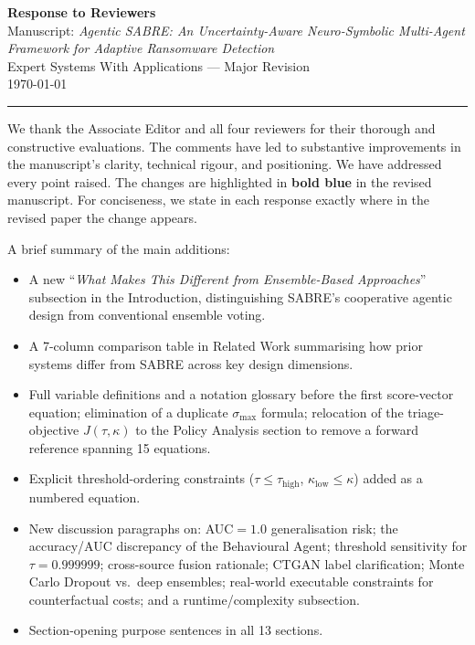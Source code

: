 \documentclass[11pt,a4paper]{article}
\begin{document}
\begin{center}
  {\LARGE\bfseries Response to Reviewers}\\[1em]
  {\large Manuscript: \textit{Agentic SABRE: An Uncertainty-Aware Neuro-Symbolic
  Multi-Agent Framework for Adaptive Ransomware Detection}}\\[0.5em]
  {\normalsize Expert Systems With Applications --- Major Revision}\\[0.5em]
  {\normalsize \today}
\end{center}

\hrule
\bigskip

We thank the Associate Editor and all four reviewers for their thorough and
constructive evaluations. The comments have led to substantive improvements in
the manuscript's clarity, technical rigour, and positioning. We have addressed
every point raised. The changes are highlighted in \textbf{bold blue} in the
revised manuscript. For conciseness, we state in each response exactly where in
the revised paper the change appears.

A brief summary of the main additions:
\begin{itemize}[leftmargin=1.5em,itemsep=2pt]
  \item A new ``\textit{What Makes This Different from Ensemble-Based Approaches}''
        subsection in the Introduction, distinguishing SABRE's cooperative agentic
        design from conventional ensemble voting.
  \item A 7-column comparison table in Related Work summarising how prior
        systems differ from SABRE across key design dimensions.
  \item Full variable definitions and a notation glossary before the first score-vector
        equation; elimination of a duplicate $\sigma_{\max}$ formula; relocation of the
        triage-objective $J(\tau,\kappa)$ to the Policy Analysis section to remove a
        forward reference spanning 15 equations.
  \item Explicit threshold-ordering constraints ($\tau \le \tau_{\text{high}}$,
        $\kappa_{\text{low}} \le \kappa$) added as a numbered equation.
  \item New discussion paragraphs on: AUC$=1.0$ generalisation risk; the
        accuracy/AUC discrepancy of the Behavioural Agent; threshold sensitivity
        for $\tau = 0.999999$; cross-source fusion rationale; CTGAN label
        clarification; Monte Carlo Dropout vs.\ deep ensembles; real-world
        executable constraints for counterfactual costs; and a runtime/complexity
        subsection.
  \item Section-opening purpose sentences in all 13 sections.
\end{itemize}
\end{document}
